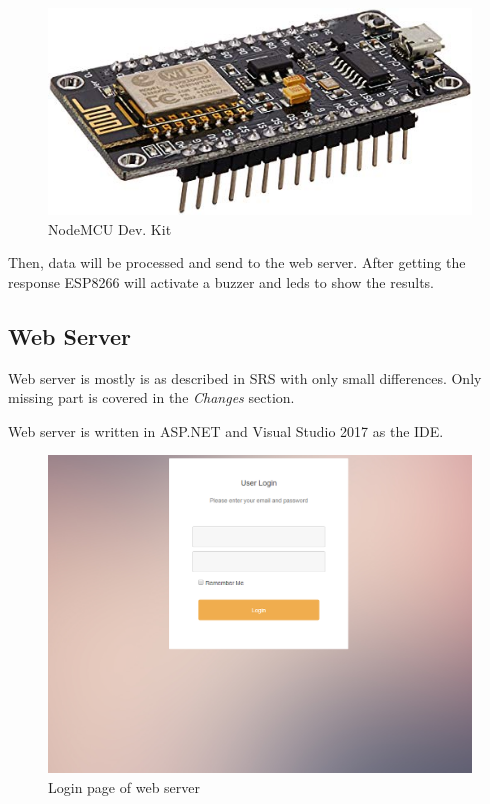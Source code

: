 \documentclass{article}
\begin{document}
\begin{figure}
 \begin{center}
	\includegraphics[scale=0.5]{nodemcu}
  	\caption{NodeMCU Dev. Kit}
  \end{center}
\end{figure}

Then, data will be processed and send to the web server. After getting the response ESP8266 will activate a buzzer and leds to show the results.


\subsection{Web Server}

Web server is mostly is as described in SRS with only small differences. Only missing part is covered in the \textit{Changes} section.

Web server is written in ASP.NET and Visual Studio 2017 as the IDE. 

\begin{figure}[H]
 \begin{center}
	\includegraphics[scale=0.5]{login}
  	\caption{Login page of web server}
  \end{center}
\end{figure}
\end{document}
